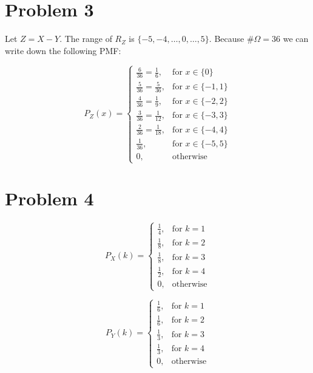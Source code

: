 \documentclass{article}
\begin{document}
\section*{Problem 3}
 Let \(Z = X - Y\). The range of \(R_{Z}\) is \(\{-5, -4, \dots, 0, \dots, 5\}\). Because
\(\#\Omega = 36\) we can write down the following PMF:

\begin{equation*}
    P_{Z}(x) = 
    \begin{cases}
        \frac{6}{36} = \frac{1}{6}, & \mbox{for \(x \in \{0\}\)} \\
        \frac{5}{36} = \frac{5}{36}, & \mbox{for \(x \in \{-1, 1\}\)} \\
        \frac{4}{36} = \frac{1}{9}, & \mbox{for \(x \in \{-2, 2\}\)} \\
        \frac{3}{36} = \frac{1}{12}, & \mbox{for \(x \in \{-3, 3\}\)} \\
        \frac{2}{36} = \frac{1}{18}, & \mbox{for \(x \in \{-4, 4\}\)} \\
        \frac{1}{36}, & \mbox{for \(x \in \{-5, 5\}\)} \\
        0, & \mbox{otherwise}
    \end{cases}
\end{equation*}


\section*{Problem 4}

\begin{equation*}
    P_{X}(k) = 
    \begin{cases}
        \frac{1}{4}, & \mbox{for \(k = 1\)} \\
        \frac{1}{8}, & \mbox{for \(k = 2\)} \\
        \frac{1}{8}, & \mbox{for \(k = 3\)} \\
        \frac{1}{2}, & \mbox{for \(k = 4\)} \\
        0, & \mbox{otherwise}
    \end{cases}
\end{equation*}

\begin{equation*}
    P_{Y}(k) = 
    \begin{cases}
        \frac{1}{6}, & \mbox{for \(k = 1\)} \\
        \frac{1}{6}, & \mbox{for \(k = 2\)} \\
        \frac{1}{3}, & \mbox{for \(k = 3\)} \\
        \frac{1}{3}, & \mbox{for \(k = 4\)} \\
        0, & \mbox{otherwise}
    \end{cases}
\end{equation*}
\end{document}

